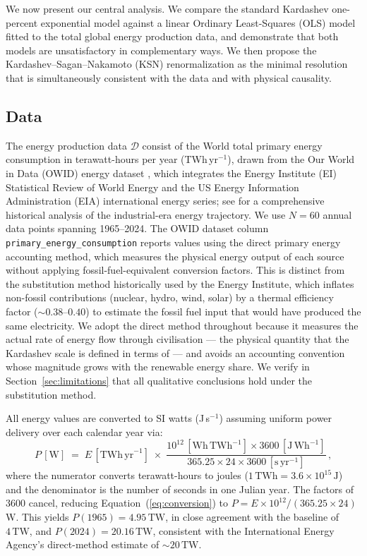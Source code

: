 \documentclass[final,5p,times,twocolumn,authoryear]{elsarticle}
\begin{document}
We now present our central analysis. We compare the standard Kardashev
one-percent exponential model against a linear Ordinary Least-Squares (OLS)
model fitted to the total global energy production data, and demonstrate that
both models are unsatisfactory in complementary ways. We then propose the
Kardashev--Sagan--Nakamoto (KSN) renormalization as the minimal resolution
that is simultaneously consistent with the data and with physical causality.
 
\subsection{Data}
\label{sec:data}
 
The energy production data $\mathcal{D}$ consist of the World total primary
energy consumption in terawatt-hours per year (TWh\,yr$^{-1}$), drawn from
the Our World in Data (OWID) energy dataset \citep{Ritchie2022}, which
integrates the Energy Institute (EI) Statistical Review of World Energy and
the US Energy Information Administration (EIA) international energy series; 
see \citet{Smil2017} for a comprehensive historical analysis of the 
industrial-era energy trajectory.
We use $N = 60$ annual data points spanning 1965--2024. The OWID dataset
column \texttt{primary\_energy\_consumption} reports values using the
direct primary energy accounting method, which measures the physical
energy output of each source without applying fossil-fuel-equivalent
conversion factors. This is distinct from the substitution method
historically used by the Energy Institute, which inflates non-fossil
contributions (nuclear, hydro, wind, solar) by a thermal efficiency
factor ($\sim 0.38$--$0.40$) to estimate the fossil fuel input that
would have produced the same electricity. We adopt the direct method
throughout because it measures the actual rate of energy flow through
civilisation --- the physical quantity that the Kardashev scale is
defined in terms of --- and avoids an accounting convention whose
magnitude grows with the renewable energy share. We verify in
Section~\ref{sec:limitations} that all qualitative conclusions hold
under the substitution method.
 
All energy values are converted to SI watts (J\,s$^{-1}$) assuming uniform
power delivery over each calendar year via:
\begin{equation}
    P\,[\mathrm{W}] \;=\; E\,[\mathrm{TWh\,yr}^{-1}]
    \;\times\; \frac{10^{12}\,[\mathrm{Wh\,TWh}^{-1}]
    \times 3600\,[\mathrm{J\,Wh}^{-1}]}
    {365.25 \times 24 \times 3600\,[\mathrm{s\,yr}^{-1}]}\,,
    \label{eq:conversion}
\end{equation}
where the numerator converts terawatt-hours to joules
($1\,\mathrm{TWh} = 3.6 \times 10^{15}\,\mathrm{J}$) and the denominator
is the number of seconds in one Julian year. The factors of $3600$ cancel,
reducing Equation~(\ref{eq:conversion}) to
$P = E \times 10^{12} / (365.25 \times 24)$\,W. This yields
$P(1965) = 4.95\,\mathrm{TW}$, in close agreement with the \citet{kar64}
baseline of $4\,\mathrm{TW}$, and $P(2024) = 20.16\,\mathrm{TW}$,
consistent with the International Energy Agency's direct-method estimate of
$\sim 20\,\mathrm{TW}$.
 
\end{document}
